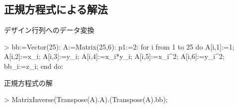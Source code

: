 \subsection{正規方程式による解法}
デザイン行列へのデータ変換
\begin{MapleInput}
> bb:=Vector(25): A:=Matrix(25,6): 
  p1:=2: 
  for i from 1 to 25 do 
    A[i,1]:=1;
    A[i,2]:=x_i; 
    A[i,3]:=y_i; 
    A[i,4]:=x_i*y_i; 
    A[i,5]:=x_i^2; 
    A[i,6]:=y_i^2;
    bb_i:=z_i; 
  end do:
\end{MapleInput}
正規方程式の解
\begin{MapleInput}
> MatrixInverse(Transpose(A).A).(Transpose(A).bb);
\end{MapleInput}
\begin{MapleOutput}
\end{MapleOutput}
